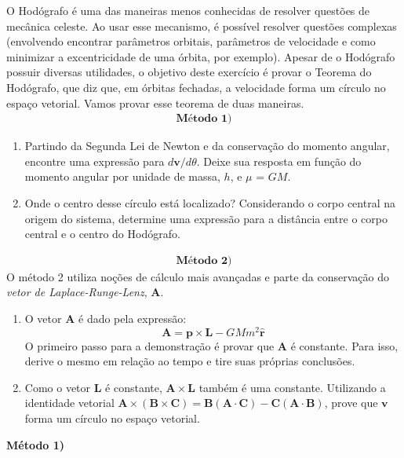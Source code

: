 \documentclass[11pt]{article}
\begin{document}
\begin{pproblem}
    O Hodógrafo é uma das maneiras menos conhecidas de resolver questões de mecânica celeste. Ao usar esse mecanismo, é possível resolver questões complexas (envolvendo encontrar parâmetros orbitais, parâmetros de velocidade e como minimizar a excentricidade de uma órbita, por exemplo). Apesar de o Hodógrafo possuir diversas utilidades, o objetivo deste exercício é provar o Teorema do Hodógrafo, que diz que, em órbitas fechadas, a velocidade forma um círculo no espaço vetorial. Vamos provar esse teorema de duas maneiras.
    \begin{align*}
    \textbf{Método 1)}
    \end{align*}
    \begin{enumerate}[label=\textbf{\Roman*.}]
        \item Partindo da Segunda Lei de Newton e da conservação do momento angular, encontre uma expressão para \(d\mathbf{v}/d\theta\). Deixe sua resposta em função do momento angular por unidade de massa, \(h\), e \(\mu\) = \(GM\). 
        \item Onde o centro desse círculo está localizado? Considerando o corpo central na origem do sistema, determine uma expressão para a distância entre o corpo central e o centro do Hodógrafo. 
    \end{enumerate}
    
    \begin{align*}
        \textbf{Método 2)}
    \end{align*}
    O método 2 utiliza noções de cálculo mais avançadas e parte da conservação do \textit{vetor de Laplace-Runge-Lenz}, \(\mathbf{A}\).
    \begin{enumerate}[label=\textbf{\Roman*.}]
        \item O vetor \(\mathbf{A}\) é dado pela expressão:
        \[
        \mathbf{A} = \mathbf{p}\times \mathbf{L} - GMm^2\mathbf{\hat{r}}
        \]
        O primeiro passo para a demonstração é provar que \(\mathbf{A}\) é constante. Para isso, derive o mesmo em relação ao tempo e tire suas próprias conclusões.
        \item Como o vetor \(\mathbf{L}\) é constante, \(\mathbf{A}\times\mathbf{L}\) também é uma constante. Utilizando a identidade vetorial \(\mathbf{A}\times(\mathbf{B}\times\mathbf{C}) = \mathbf{B}(\mathbf{A}\cdot\mathbf{C}) - \mathbf{C}(\mathbf{A}\cdot\mathbf{B}) \), prove que \(\mathbf{v}\) forma um círculo no espaço vetorial.    
    \end{enumerate}
    \begin{pssolution*}{}{}
        \textbf{Método 1)}


\end{pssolution*}
\end{pproblem}
\end{document}
